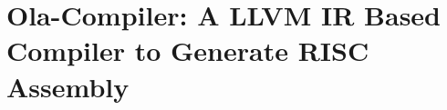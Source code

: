\section{Ola-Compiler: A LLVM IR Based Compiler to Generate RISC Assembly}\label{sec:ola-compiler}




